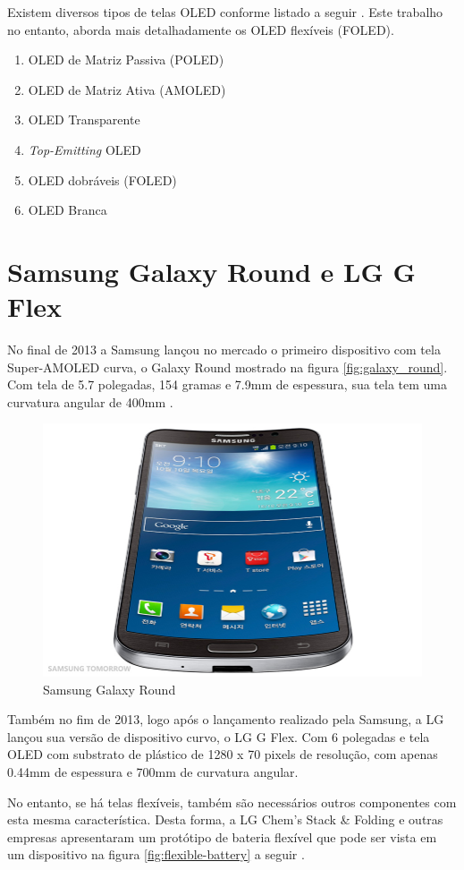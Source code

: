 Existem diversos tipos de telas OLED conforme listado a seguir \cite{HSWOLED}. Este trabalho no entanto, aborda mais detalhadamente os OLED flexíveis (FOLED).

\begin{enumerate}
	\item OLED de Matriz Passiva (POLED)
	\item OLED de Matriz Ativa (AMOLED)
	\item OLED Transparente 
	\item \textit{Top-Emitting} OLED 
	\item OLED dobráveis (FOLED)
	\item OLED Branca 
\end{enumerate}


\section{Samsung Galaxy Round e LG G Flex}
\label{sec:devicesnomercado}

No final de 2013 a Samsung lançou no mercado o primeiro dispositivo com tela Super-AMOLED curva, o Galaxy Round mostrado na figura \ref{fig:galaxy_round}. Com tela de 5.7 polegadas, 154 gramas e 7.9mm de espessura, sua tela tem uma curvatura angular de 400mm \cite{NOLEDDN}.

\begin{figure}[!h]
  \centering
  \includegraphics[width=.40\textwidth]{./figuras/galaxy-round} 
  \caption{Samsung Galaxy Round}
  \label{fig:galaxy-round} 
\end{figure}

Também no fim de 2013, logo após o lançamento realizado pela Samsung, a LG lançou sua versão de dispositivo curvo, o LG G Flex. Com 6 polegadas e tela OLED com substrato de plástico de 1280 x 70 pixels de resolução, com apenas 0.44mm de espessura e 700mm de curvatura angular.

No entanto, se há telas flexíveis, também são necessários outros componentes com esta mesma característica. Desta forma, a LG Chem’s Stack & Folding e outras empresas apresentaram um protótipo de bateria flexível que pode ser vista em um dispositivo na figura \ref{fig:flexible-battery} a seguir \cite{NOLEDDN}.

